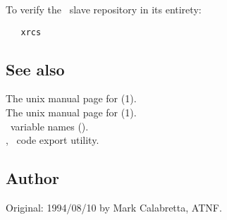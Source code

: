 To verify the \aipspp\ slave repository in its entirety:

\begin{verbatim}
   xrcs
\end{verbatim}

\subsection*{See also}

The unix manual page for (1).\\
The unix manual page for (1).\\
\aipspp\ variable names ().\\
, \aipspp\ code export utility.

\subsection*{Author}

Original: 1994/08/10 by Mark Calabretta, ATNF.
